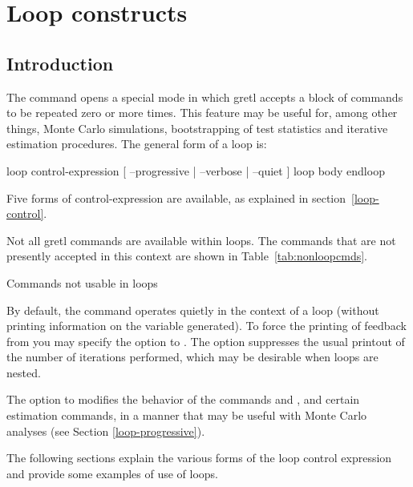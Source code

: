 \chapter{Loop constructs}
\label{chap:looping}

\section{Introduction}
\label{loop-intro}

The command  opens a special mode in which gretl
accepts a block of commands to be repeated zero or more times.  This
feature may be useful for, among other things, Monte Carlo simulations,
bootstrapping of test statistics and iterative estimation procedures.
The general form of a loop is:

\begin{code}
loop control-expression [ --progressive | --verbose | --quiet ]
   loop body
endloop
\end{code}

Five forms of control-expression are available, as explained in
section~\ref{loop-control}.

Not all gretl commands are available within loops.  The commands
that are not presently accepted in this context are shown in
Table~\ref{tab:nonloopcmds}.

\begin{table}[htbp]
\caption{Commands not usable in loops}
\label{tab:nonloopcmds}
\begin{center}

\end{center}
\end{table}

By default, the  command operates quietly in the context of
a loop (without printing information on the variable generated).  To
force the printing of feedback from  you may specify the
 option to .  The  option
suppresses the usual printout of the number of iterations performed,
which may be desirable when loops are nested.

The  option to  modifies the behavior of
the commands  and , and certain estimation
commands, in a manner that may be useful with Monte Carlo analyses
(see Section \ref{loop-progressive}).
    
The following sections explain the various forms of the loop control
expression and provide some examples of use of loops.  

